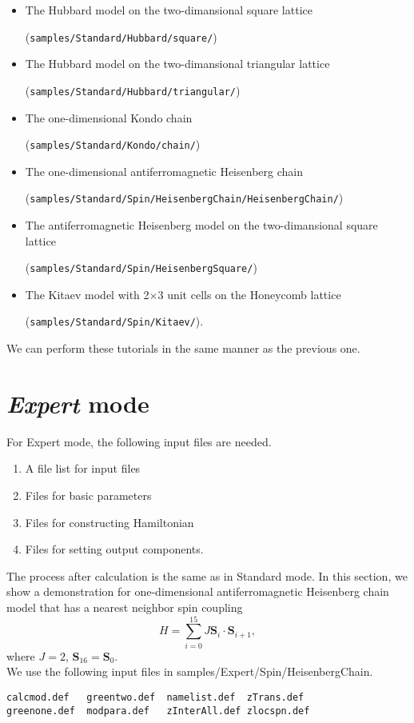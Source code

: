 \begin{itemize}
\item The Hubbard model on the two-dimansional square lattice

  (\verb|samples/Standard/Hubbard/square/|)
\item The Hubbard model on the two-dimansional triangular lattice
  
  (\verb|samples/Standard/Hubbard/triangular/|)
\item The one-dimensional Kondo chain

  (\verb|samples/Standard/Kondo/chain/|)
\item The one-dimensional antiferromagnetic Heisenberg chain
  
  (\verb|samples/Standard/Spin/HeisenbergChain/HeisenbergChain/|)
\item The antiferromagnetic Heisenberg model on the two-dimansional square lattice
  
  (\verb|samples/Standard/Spin/HeisenbergSquare/|)
\item The Kitaev model with 2$\times$3 unit cells on the Honeycomb lattice
  
  (\verb|samples/Standard/Spin/Kitaev/|).
\end{itemize}

We can perform these tutorials in the same manner as the previous one.

\section{{\it Expert} mode}
For Expert mode, the following input files are needed.
\begin{enumerate}
\item A file list for input files
\item Files for basic parameters
\item Files for constructing Hamiltonian
\item Files for setting output components.
\end{enumerate}
The process after calculation is the same as in Standard mode.
In this section, we show a demonstration for one-dimensional
antiferromagnetic Heisenberg chain model that has a nearest neighbor spin coupling
\begin{equation}
H=\sum_{i=0}^{15} J {\bm S}_i\cdot {\bm S}_{i+1},
\end{equation}
where $J=2$, ${\bm S}_{16}={\bm S}_{0}$.\\
We use the following input files in samples/Expert/Spin/HeisenbergChain.\\
\begin{minipage}{15cm}
\begin{screen}
\begin{verbatim}
calcmod.def   greentwo.def  namelist.def  zTrans.def
greenone.def  modpara.def   zInterAll.def zlocspn.def
\end{verbatim}
\end{screen}
\end{minipage}

